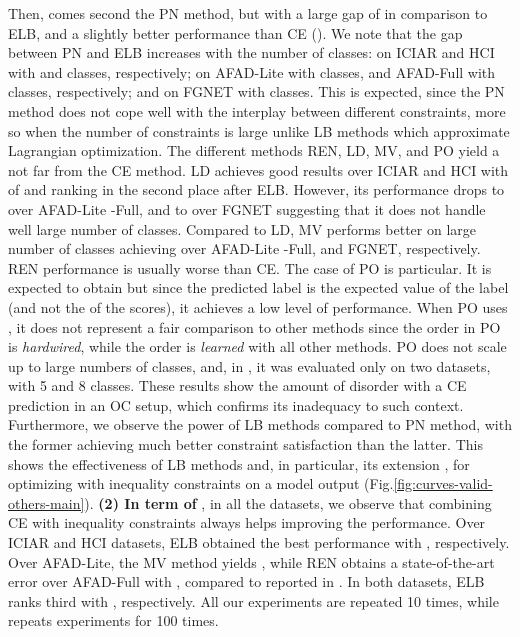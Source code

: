 \documentclass[8pt]{article}
\theoremstyle{definition}
\begin{document}
 Then, comes second the PN method, but with a large gap of  in comparison to ELB, and a slightly  better performance than CE (). We note that the gap between PN and ELB increases with the number of classes:  on ICIAR and HCI with  and  classes, respectively;  on AFAD-Lite with  classes, and AFAD-Full with  classes, respectively; and  on FGNET with  classes. This is expected, since the PN method does not cope well with the interplay between different constraints, more so when the number of constraints is large unlike LB methods which approximate Lagrangian optimization. \hspace{2mm} The different methods REN, LD, MV, and PO yield a  not far from the CE method. LD achieves good results over ICIAR and HCI with  of  and  ranking in the second place after ELB. However, its performance drops to  over AFAD-Lite -Full, and to  over FGNET suggesting that it does not handle well large number of classes. Compared to LD, MV performs better on large number of classes achieving  over AFAD-Lite -Full, and FGNET, respectively. REN performance is usually worse than CE. The case of PO is particular. It is expected to obtain  but since the predicted label is the expected value of the label (and not the  of the scores), it achieves a low level of performance. When PO uses , it does not represent a fair comparison to other methods since the order in PO is \emph{hardwired}, while the order is \emph{learned} with all other methods. PO \citep{beckham2017unimodal} does not scale up to large numbers of classes, and, in \citep{beckham2017unimodal}, it was evaluated only on two datasets, with 5 and 8 classes. \hspace{2mm}  These results show the amount of disorder with a CE prediction in an OC setup, which confirms its inadequacy to such context. Furthermore, we observe the power of LB methods compared to PN method, with the former achieving much better constraint satisfaction than the latter. This shows the effectiveness of LB methods and, in particular, its extension \citep{kervadec2019log}, for optimizing with inequality constraints
 on a model output (Fig.\ref{fig:curves-valid-others-main}).
\textbf{(2) In term of} , in all the datasets, we observe that combining CE with inequality constraints always helps improving the performance. Over ICIAR and HCI datasets, ELB obtained the best performance with , respectively. Over AFAD-Lite, the MV method yields , while REN obtains a state-of-the-art error over AFAD-Full with , compared to   reported in \citep{niu2016ordinal}. In both datasets, ELB ranks third with , respectively. All our experiments are repeated 10 times, while \citep{niu2016ordinal} repeats experiments for 100 times.
\end{document}
